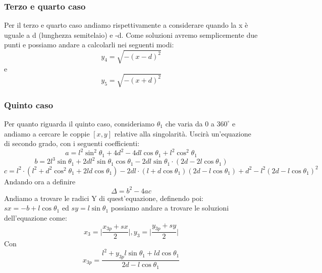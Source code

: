 \subsubsection*{Terzo e quarto caso}
Per il terzo e quarto caso andiamo rispettivamente a considerare quando la x è uguale a d (lunghezza semitelaio) e -d. Come soluzioni avremo semplicemente due punti e possiamo andare a calcolarli nei seguenti modi:
\begin{equation}
    y_4 = \sqrt{-(x-d)^2}
\end{equation}
e
\begin{equation}
    y_5 = \sqrt{-(x+d)^2}
\end{equation}
\subsubsection*{Quinto caso}
Per quanto riguarda il quinto caso, consideriamo $\theta_1$ che varia da 0 a $360^\circ$ e andiamo a cercare le coppie $[x,y]$ relative alla singolarità. Uscirà un'equazione di secondo grado, con i seguenti coefficienti:
\begin{equation*}
    a = l^2\sin^2\theta_1 + 4d^2-4dl\cos\theta_1 + l^2\cos^2\theta_1
\end{equation*}
\begin{equation*}
    b = 2l^3\sin\theta_1 + 2dl^2\sin\theta_1\cos\theta_1-2dl\sin\theta_1\cdot(2d-2l\cos\theta_1)
\end{equation*}
\begin{equation*}
    c = l^2\cdot(l^2+d^2\cos^2\theta_1+2ld\cos\theta_1)-2dl\cdot(l+d\cos\theta_1)(2d-l\cos\theta_1)+d^2-l^2(2d-l\cos\theta_1)^2
\end{equation*}
Andando ora a definire 
\begin{equation*}
    \Delta = b^2-4ac
\end{equation*}
Andiamo a trovare le radici Y di quest'equazione, definendo poi: $sx = -b+l\cos\theta_1$ ed $sy = l\sin\theta_1$ possiamo andare a trovare le soluzioni dell'equazione come:
\begin{equation}
    x_3 = \bigg|\frac{x_{3p}+sx}{2}\bigg|, y_3 = \bigg|\frac{y_{3p}+sy}{2}\bigg|
\end{equation}
Con 
\begin{equation*}
    x_{3p} = \frac{l^2+y_{3p}l\sin\theta_1+ld\cos\theta_1}{2d-l\cos\theta_1}
\end{equation*}
